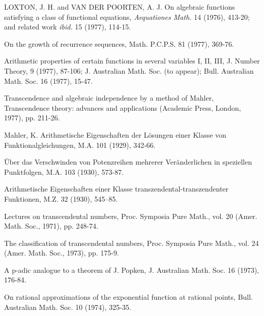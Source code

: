 \begin{hanglist}
    \item LOXTON, J. H. and VAN DER POORTEN, A. J. On algebraic functions satisfying a class of functional equations, \textit{Aequationes Math.} 14 (1976), 413-20; and related work \textit{ibid.} 15 (1977), 114-15.
    \item \hspace{1.5em} On the growth of recurrence sequences, Math. P.C.P.S. 81 (1977), 369-76.
    \item \hspace{1.5em} Arithmetic properties of certain functions in several variables I, II, III, J. Number Theory, 9 (1977), 87-106; J. Australian Math. Soc. (to appear); Bull. Australian Math. Soc. 16 (1977), 15-47.
    \item \hspace{1.5em} Transcendence and algebraic independence by a method of Mahler, Transcendence theory: advances and applications (Academic Press, London, 1977), pp. 211-26.
    \item Mahler, K. Arithmetische Eigenschaften der Lösungen einer Klasse von Funktionalgleichungen, M.A. 101 (1929), 342-66.
    \item \hspace{1.5em} Über das Verschwinden von Potenzreihen mehrerer Veränderlichen in speziellen Punktfolgen, M.A. 103 (1930), 573-87.
    \item \hspace{1.5em} Arithmetische Eigenschaften einer Klasse transzendental-transzendenter Funktionen, M.Z. 32 (1930), 545–85.
    \item \hspace{1.5em} Lectures on transcendental numbers, Proc. Symposia Pure Math., vol. 20 (Amer. Math. Soc., 1971), pp. 248-74.
    \item \hspace{1.5em} The classification of transcendental numbers, Proc. Symposia Pure Math., vol. 24 (Amer. Math. Soc., 1973), pp. 175-9.
    \item \hspace{1.5em} A p-adic analogue to a theorem of J. Popken, J. Australian Math. Soc. 16 (1973), 176-84.
    \item \hspace{1.5em} On rational approximations of the exponential function at rational points, Bull. Australian Math. Soc. 10 (1974), 325-35.

\end{hanglist}
